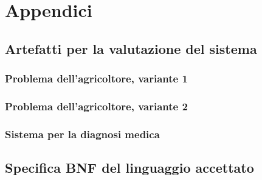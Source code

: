 \setcounter{chapter}{1}
\setcounter{program}{0}
\chapter*{Appendici}


\section*{Artefatti per la valutazione del sistema}
\subsection*{Problema dell'agricoltore, variante 1}


\subsection*{Problema dell'agricoltore, variante 2}



\subsection*{Sistema per la diagnosi medica}



\pagebreak

\section*{Specifica BNF del linguaggio accettato}


